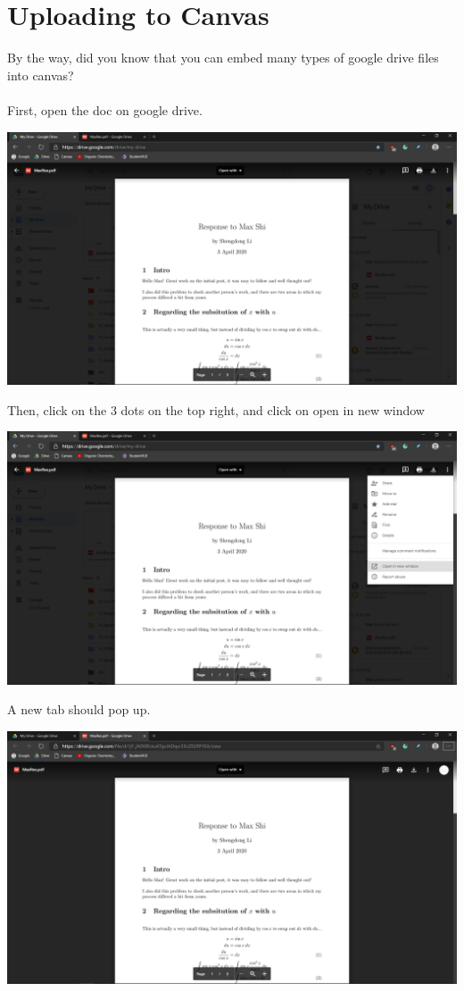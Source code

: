 \documentclass[letterpaper, 12pt]{article}
\begin{document}
\section{Uploading to Canvas}
By the way, did you know that you can embed many types of google drive files into canvas?\\~\\
First, open the doc on google drive.
\begin{center}
    \includegraphics[scale=0.3]{1.png}
\end{center}
Then, click on the 3 dots on the top right, and click on open in new window
\begin{center}
    \includegraphics[scale=0.3]{2.png}
\end{center}
A new tab should pop up.
\begin{center}
    \includegraphics[scale=0.3]{3.png}
\end{center}
\end{document}
